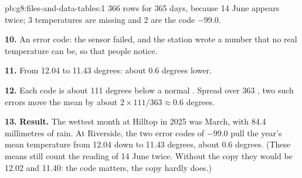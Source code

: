 \begin{solution}{pb:g8:files-and-data-tables:1}
366 rows for 365 days, because 14 June appears twice; 3 temperatures are
missing and 2 are the code $-99.0$.

\textbf{10.} An error code: the sensor failed, and the station wrote a number
that no real temperature can be, so that people notice.

\textbf{11.} From 12.04 to 11.43 degrees: about 0.6 degrees lower.

\textbf{12.} Each code is about 111 degrees below a normal . Spread over
363 , two such errors move the mean by about
$2 \times 111 / 363 \approx 0.6$ degrees.

\textbf{13.} \textbf{Result.} The wettest month at Hilltop in 2025 was March,
with 84.4 millimetres of rain. At Riverside, the two error codes of $-99.0$
pull the year's mean temperature from 12.04 down to 11.43 degrees, about 0.6
degrees. (These means still count the reading of 14 June twice. Without the
copy they would be 12.02 and 11.40: the code matters, the copy hardly does.)
\end{solution}
